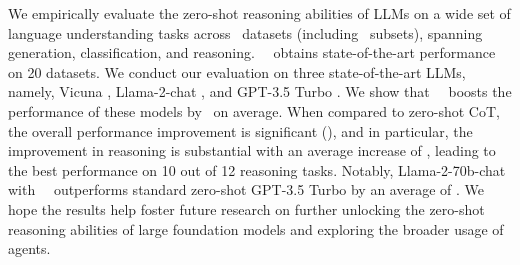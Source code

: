 We empirically evaluate the zero-shot reasoning abilities of LLMs on a wide set of language understanding tasks across \NumDatasets\ datasets (including \NumSubsets\ subsets), spanning generation, classification, and reasoning. \zeroshotstart\ \method\ obtains state-of-the-art performance on 20 datasets. We conduct our evaluation on three state-of-the-art LLMs, namely, Vicuna \citep{vicuna2023}, Llama-2-chat \citep{touvron2023llama2}, and GPT-3.5 Turbo \citep{openaichatgpt}. We show that \zeroshotmid\ \method\ boosts the performance of these models by \ThreemodelsOverallAvgwinOverZs\ on average. When compared to zero-shot CoT, the overall performance improvement is significant (\ThreemodelsOverallAvgwinOverZscot), and in particular, the improvement in reasoning is substantial with an average increase of \ThreemodelsReasoningAvgwinOverZscot, leading to the best performance on 10 out of 12 reasoning tasks. Notably, Llama-2-70b-chat with \zeroshotmid\ \method\ outperforms standard zero-shot GPT-3.5 Turbo by an average of \LlamaTwoSeventyChatAvgwinOverChatgptZs. We hope the results help foster future research on further unlocking the zero-shot reasoning abilities of large foundation models and exploring the broader usage of agents.